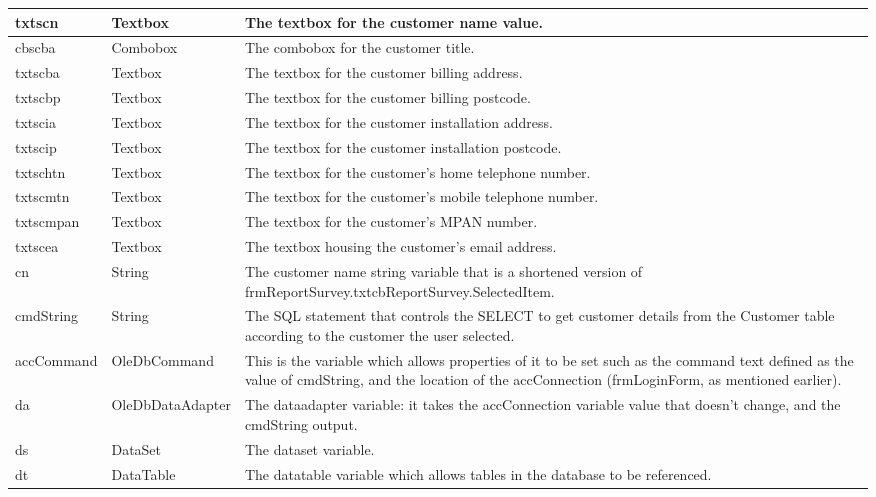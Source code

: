 \begin{longtable}{ | p{4cm} | p{3cm} | p{10cm} |}
		\hline
		txtscn & Textbox & The textbox for the customer name value.\\
		\hline
		cbscba & Combobox & The combobox for the customer title.\\
		\hline
		txtscba & Textbox & The textbox for the customer billing address.\\
		\hline
		txtscbp & Textbox & The textbox for the customer billing postcode.\\
		\hline
		txtscia & Textbox & The textbox for the customer installation address.\\
		\hline
		txtscip & Textbox & The textbox for the customer installation postcode.\\
		\hline
		txtschtn & Textbox & The textbox for the customer's home telephone number.\\
		\hline
		txtscmtn & Textbox & The textbox for the customer's mobile telephone number.\\
		\hline
		txtscmpan & Textbox & The textbox for the customer's MPAN number.\\
		\hline
		txtscea & Textbox & The textbox housing the customer's email address.\\
		\hline
		cn & String & The customer name string variable that is a shortened version of frmReportSurvey.txtcbReportSurvey.SelectedItem.\\
		\hline
		cmdString & String & The SQL statement that controls the SELECT to get customer details from the Customer table according to the customer the user selected.\\
		\hline
		accCommand & OleDbCommand & This is the variable which allows properties of it to be set such as the command text defined as the value of cmdString, and the location of the accConnection (frmLoginForm, as mentioned earlier).\\
		\hline
		da & OleDbDataAdapter & The dataadapter variable: it takes the accConnection variable value that doesn't change, and the cmdString output.\\
		\hline
		ds & DataSet & The dataset variable.\\
		\hline
		dt & DataTable & The datatable variable which allows tables in the database to be referenced.\\
		\hline
	\end{longtable}
	
